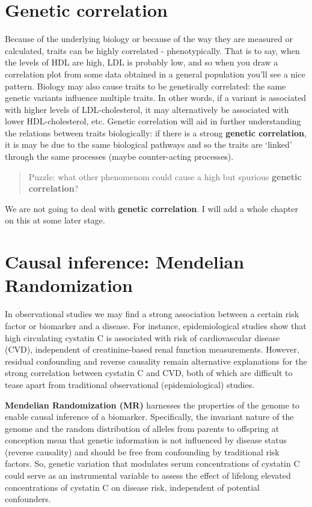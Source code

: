 \documentclass[
]{book}
\begin{document}
\hypertarget{genetic-correlation}{%
\section{Genetic correlation}\label{genetic-correlation}}

Because of the underlying biology or because of the way they are measured or calculated, traits can be highly correlated - phenotypically. That is to say, when the levels of HDL are high, LDL is probably low, and so when you draw a correlation plot from some data obtained in a general population you'll see a nice pattern. Biology may also cause traits to be genetically correlated: the same genetic variants influence multiple traits. In other words, if a variant is associated with higher levels of LDL-cholesterol, it may alternatively be associated with lower HDL-cholesterol, etc. Genetic correlation will aid in further understanding the relations between traits biologically: if there is a strong \textbf{genetic correlation}, it is may be due to the same biological pathways and so the traits are `linked' through the same processes (maybe counter-acting processes).

\begin{quote}
Puzzle: what other phenomenom could cause a high but spurious \textbf{genetic correlation}?
\end{quote}

We are not going to deal with \textbf{genetic correlation}. I will add a whole chapter on this at some later stage.

\hypertarget{causal-inference-mendelian-randomization}{%
\section{Causal inference: Mendelian Randomization}\label{causal-inference-mendelian-randomization}}

In observational studies we may find a strong association between a certain risk factor or biomarker and a disease. For instance, epidemiological studies show that high circulating cystatin C is associated with risk of cardiovascular disease (CVD), independent of creatinine-based renal function measurements\citep{vanderlaan2016}. However, residual confounding and reverse causality remain alternative explanations for the strong correlation between cystatin C and CVD, both of which are difficult to tease apart from traditional observational (epidemiological) studies.

\textbf{Mendelian Randomization (MR)} harnesses the properties of the genome to enable causal inference of a biomarker. Specifically, the invariant nature of the genome and the random distribution of alleles from parents to offspring at conception mean that genetic information is not influenced by disease status (reverse causality) and should be free from confounding by traditional risk factors\citep{vanderlaan2016}. So, genetic variation that modulates serum concentrations of cystatin C could serve as an instrumental variable to assess the effect of lifelong elevated concentrations of cystatin C on disease risk, independent of potential confounders\citep{vanderlaan2016}.
\end{document}

